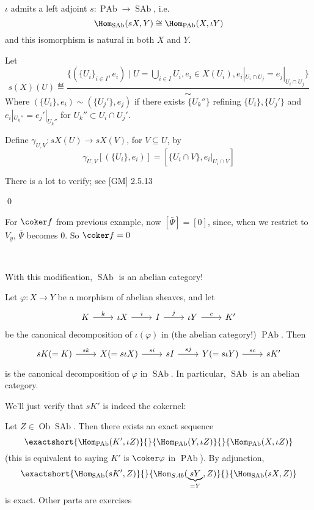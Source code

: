\documentclass[x11names,reqno,14pt]{extarticle}
\DeclareMathOperator{\SAb}{SAb}
\DeclareMathOperator{\PAb}{PAb}
\DeclareMathOperator{\Ob}{Ob}
\begin{document}
\prop

$\iota$ admits a left adjoint $s:\PAb\to\SAb$, i.e. 
\[
\Hom_{\SAb}(sX, Y) \cong \Hom_{\PAb}(X, \iota Y)
\]
and this isomorphism is natural in both $X$ and $Y$.

\proof

Let 
\[
s(X)(U) \eqdef \frac{\{(\{U_i\}_{i\in I}, e_i) \mid U = \bigcup_{i\in I} U_i, e_i \in X(U_i), e_i|_{U_i \cap U_j} = e_j|_{U_i \cap U_j}\}}{\sim}
\]
Where $(\{U_i\}, e_i) \sim (\{U_j'\}, e_j)$ if there exists $\{U_k''\}$ refining $\{U_i\}, \{U_j'\}$ and $e_i|_{U_k''} = e_j'|_{U_k''}$ for $U_k'' \subset U_i \cap U_j'$. 

Define $\gamma_{U,V}:sX(U)\to sX(V)$, for $V \subseteq U$, by 
\[
\gamma_{U,V}[(\{U_i\},e_i)] = [\{U_i \cap V\}, e_i|_{U_i \cap V}]
\]

There is a lot to verify; see [GM] 2.5.13

\qed

\exm

For $\coker f$ from previous example, now $[\bar{\Psi}] = [0]$, since, when we restrict to $V_y$, $\bar{\Psi}$ becomes 0. So $\coker f = 0$

\,

With this modification, $\SAb$ is an abelian category!

\prop

Let $\varphi:X\to Y$ be a morphism of abelian sheaves, and let 
\[
\begin{tikzcd}
K\ar[r, "k"] & \iota X \ar[r, "i"] & I \ar[r, "j"] & \iota Y \ar[r, "c"] & K'
\end{tikzcd}
\]
be the canonical decomposition of $\iota(\varphi)$ in (the abelian category!) $\PAb$. Then
\[
\begin{tikzcd}
sK(= K)\ar[r, "sk"] & X (= s\iota X) \ar[r, "si"] & sI \ar[r, "sj"] & Y (= s\iota Y) \ar[r, "sc"] & sK'
\end{tikzcd}
\]
is the canonical decomposition of $\varphi$ in $\SAb$. In particular, $\SAb$ is an abelian category. 

\proof

We'll just verify that $sK'$ is indeed the cokernel:

Let $Z\in \Ob\SAb$. Then there exists an exact sequence
\[
\exactshort{\Hom_{\PAb}(K',\iota Z)}{}{\Hom_{\PAb}(Y,\iota Z)}{}{\Hom_{\PAb}(X,\iota Z)}
\]
(this is equivalent to saying $K'$ is $\coker\varphi$ in $\PAb$). By adjunction,
\[
\exactshort{\Hom_{\SAb}(sK', Z)}{}{\Hom_{SAb}(\underbrace{sY}_{=Y}, Z)}{}{\Hom_{\SAb}(sX,Z)}
\]
is exact. Other parts are exercises
\end{document}
